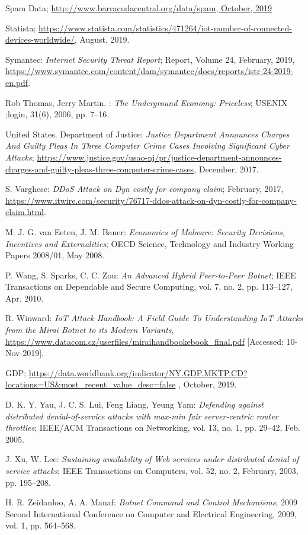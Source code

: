 \begin{thebibliography}{99}
 Spam Data; \url{http://www.barracudacentral.org/data/spam, October, 2019} %

 Statista; \url{https://www.statista.com/statistics/471264/iot-number-of-connected-devices-worldwide/}, August, 2019.

 Symantec: \emph{Internet Security Threat Report}; Report, Volume 24, February, 2019, \url{https://www.symantec.com/content/dam/symantec/docs/reports/istr-24-2019-en.pdf}.

 Rob Thomas, Jerry Martin. : \emph{The Underground Economy: Priceless}; USENIX ;login, 31(6), 2006, pp. 7--16.

 United States. Department of Justice: \emph{Justice Department Announces Charges And Guilty Pleas In Three Computer Crime Cases Involving Significant Cyber Attacks}; \url{https://www.justice.gov/usao-nj/pr/justice-department-announces-charges-and-guilty-pleas-three-computer-crime-cases}, December, 2017.

 S. Varghese: \emph{DDoS Attack on Dyn costly for company claim}; February, 2017, \url{https://www.itwire.com/security/76717-ddos-attack-on-dyn-costly-for-company-claim.html}.

 M. J. G. van Eeten, J. M. Bauer: \emph{Economics of Malware: Security Decisions, Incentives and Externalities}; OECD Science, Technology and Industry Working Papers 2008/01, May 2008.

 P. Wang, S. Sparks, C. C. Zou: \emph{An Advanced Hybrid Peer-to-Peer Botnet}; IEEE Transactions on Dependable and Secure Computing, vol. 7, no. 2, pp. 113--127, Apr. 2010.

 R. Winward: \emph{IoT Attack Handbook: A Field Guide To Understanding IoT Attacks from the Mirai Botnet to its Modern Variants}, \url{https://www.datacom.cz/userfiles/miraihandbookebook_final.pdf} [Accessed: 10-Nov-2019].

 GDP; \url{https://data.worldbank.org/indicator/NY.GDP.MKTP.CD?locations=US&most_recent_value_desc=false} , October, 2019.

 D. K. Y. Yau, J. C. S. Lui, Feng Liang, Yeung Yam: \emph{Defending against distributed denial-of-service attacks with max-min fair server-centric router throttles}; IEEE/ACM Transactions on Networking, vol. 13, no. 1, pp. 29--42, Feb. 2005.

 J. Xu, W. Lee: \emph{Sustaining availability of Web services under distributed denial of service attacks}; IEEE Transactions on Computers, vol. 52, no. 2, February, 2003, pp. 195--208.

 H. R. Zeidanloo, A. A. Manaf: \emph{Botnet Command and Control Mechanisms}; 2009 Second International Conference on Computer and Electrical Engineering, 2009, vol. 1, pp. 564--568.

\end{thebibliography}

